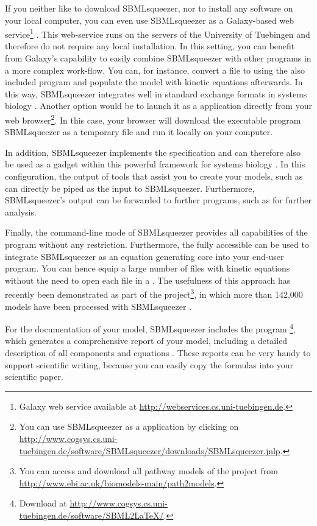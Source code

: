 If you neither like to download SBMLsqueezer, nor to install any software on
your local computer, you can even use SBMLsqueezer as a Galaxy-based
web service\footnote{Galaxy web service available at \url{http://webservices.cs.uni-tuebingen.de}.} \citet{Goecks2010}.
This web-service runs on the servers of the University of Tuebingen and therefore do not require any local installation.
In this setting, you can benefit from Galaxy's capability to easily combine SBMLsqueezer with other programs in a more complex work-flow. You can, for instance, convert a \BioPAX file to \SBML using the also included program \BioPAXSBML \citep{Buechel2012a} and populate the model with kinetic equations afterwards.
In this way, SBMLsqueezer integrates well in standard exchange formats in systems biology \citep{Draeger2014a}.
Another option would be to launch it as a \JavaWebStart application directly from your web
browser\footnote{You can use SBMLsqueezer as a \JavaWebStart application by
clicking on \url{http://www.cogsys.cs.uni-tuebingen.de/software/SBMLsqueezer/downloads/SBMLsqueezer.jnlp}.}.
In this case, your browser will download the executable program SBMLsqueezer as a temporary file and run it locally on your computer.

In addition, SBMLsqueezer implements the \Garuda specification and can therefore
also be used as a gadget within this powerful framework for systems biology
\citep{Ghosh2011}. In this configuration, the output of tools that assist you
to create your models, such as \KEGGtranslator \citep{Wrzodek2011, Wrzodek2013}
can directly be piped as the input to SBMLsqueezer. Furthermore, SBMLsqueezer's
output can be forwarded to further programs, such as \SBMLsimulator
\citep{Keller2013, Keller2014} for further analysis.

Finally, the command-line mode of SBMLsqueezer provides all capabilities of the
program without any restriction.
Furthermore, the fully accessible \API can be used
to integrate SBMLsqueezer as an equation generating core into your end-user
program.
You can hence equip a large number of files with kinetic equations without the
need to open each file in a \GUI.
The usefulness of this approach has recently been demonstrated as part of the
\pathmodels project\footnote{You can access and download all pathway models of
the \pathmodels project from \url{http://www.ebi.ac.uk/biomodels-main/path2models}.},
in which more than 142,000 \SBML models have been processed with SBMLsqueezer
\citep{Buechel2013}.

For the documentation of your model, SBMLsqueezer includes the program
\SBMLLaTeX\footnote{Download \SBMLLaTeX at \url{http://www.cogsys.cs.uni-tuebingen.de/software/SBML2LaTeX/}.},
which generates a comprehensive report of your model, including a detailed
description of all components and equations \citep{Draeger2009b, Draeger2010a}.
These reports can be very handy to support scientific writing, because you can
easily copy the formulas into your scientific paper.

